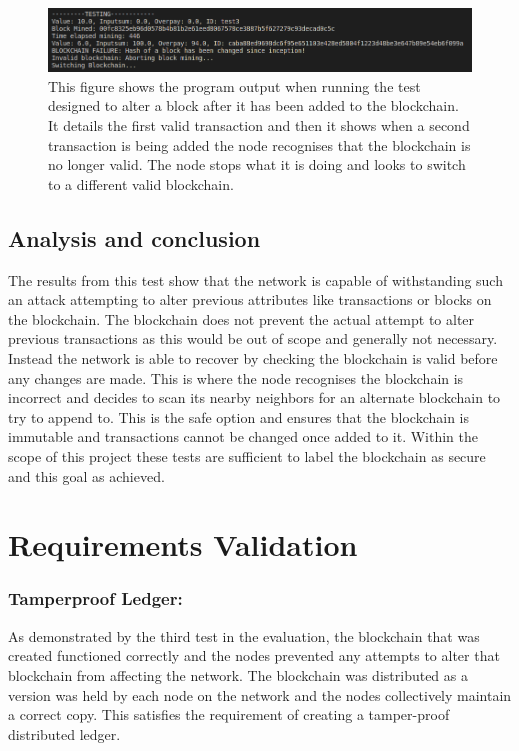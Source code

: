\documentclass{l4proj}
\begin{document}
\begin{figure}[!ht]
    \centering
    \includegraphics[width=1\linewidth]{images/check3.png}    
    \caption
    {
        This figure shows the program output when running the test designed to alter a block after it has been added
        to the blockchain. It details the first valid transaction and then it shows when a second transaction is being
        added the node recognises that the blockchain is no longer valid. The node stops what it is doing and looks
        to switch to a different valid blockchain.
    }
    \label{fig:check3} 
\end{figure}

\subsection{Analysis and conclusion}
The results from this test show that the network is capable of withstanding such an attack attempting to alter previous
attributes like transactions or blocks on the blockchain. The blockchain does not prevent the actual attempt to alter
previous transactions as this would be out of scope and generally not necessary. Instead the network is able to recover
by checking the blockchain is valid before any changes are made. This is where the node recognises the blockchain is
incorrect and decides to scan its nearby neighbors for an alternate blockchain to try to append to. This is the safe
option and ensures that the blockchain is immutable and transactions cannot be changed once added to it. Within the
scope of this project these tests are sufficient to label the blockchain as secure and this goal as achieved.


\section{Requirements Validation}

\subsubsection{Tamperproof Ledger:}
As demonstrated by the third test in the evaluation, the blockchain that was created functioned correctly and the nodes
prevented any attempts to alter that blockchain from affecting the network. The blockchain was distributed as a version
was held by each node on the network and the nodes collectively maintain a correct copy. This satisfies the requirement of creating a
tamper-proof distributed ledger.
\end{document}
